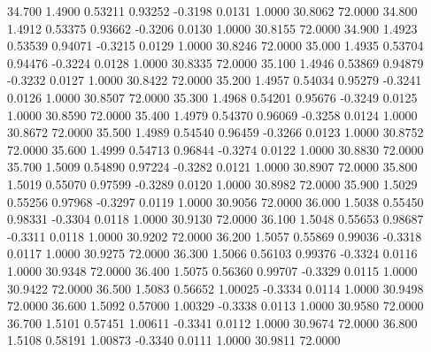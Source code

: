   34.700   1.4900   0.53211   0.93252  -0.3198   0.0131   1.0000  30.8062  72.0000
  34.800   1.4912   0.53375   0.93662  -0.3206   0.0130   1.0000  30.8155  72.0000
  34.900   1.4923   0.53539   0.94071  -0.3215   0.0129   1.0000  30.8246  72.0000
  35.000   1.4935   0.53704   0.94476  -0.3224   0.0128   1.0000  30.8335  72.0000
  35.100   1.4946   0.53869   0.94879  -0.3232   0.0127   1.0000  30.8422  72.0000
  35.200   1.4957   0.54034   0.95279  -0.3241   0.0126   1.0000  30.8507  72.0000
  35.300   1.4968   0.54201   0.95676  -0.3249   0.0125   1.0000  30.8590  72.0000
  35.400   1.4979   0.54370   0.96069  -0.3258   0.0124   1.0000  30.8672  72.0000
  35.500   1.4989   0.54540   0.96459  -0.3266   0.0123   1.0000  30.8752  72.0000
  35.600   1.4999   0.54713   0.96844  -0.3274   0.0122   1.0000  30.8830  72.0000
  35.700   1.5009   0.54890   0.97224  -0.3282   0.0121   1.0000  30.8907  72.0000
  35.800   1.5019   0.55070   0.97599  -0.3289   0.0120   1.0000  30.8982  72.0000
  35.900   1.5029   0.55256   0.97968  -0.3297   0.0119   1.0000  30.9056  72.0000
  36.000   1.5038   0.55450   0.98331  -0.3304   0.0118   1.0000  30.9130  72.0000
  36.100   1.5048   0.55653   0.98687  -0.3311   0.0118   1.0000  30.9202  72.0000
  36.200   1.5057   0.55869   0.99036  -0.3318   0.0117   1.0000  30.9275  72.0000
  36.300   1.5066   0.56103   0.99376  -0.3324   0.0116   1.0000  30.9348  72.0000
  36.400   1.5075   0.56360   0.99707  -0.3329   0.0115   1.0000  30.9422  72.0000
  36.500   1.5083   0.56652   1.00025  -0.3334   0.0114   1.0000  30.9498  72.0000
  36.600   1.5092   0.57000   1.00329  -0.3338   0.0113   1.0000  30.9580  72.0000
  36.700   1.5101   0.57451   1.00611  -0.3341   0.0112   1.0000  30.9674  72.0000
  36.800   1.5108   0.58191   1.00873  -0.3340   0.0111   1.0000  30.9811  72.0000
